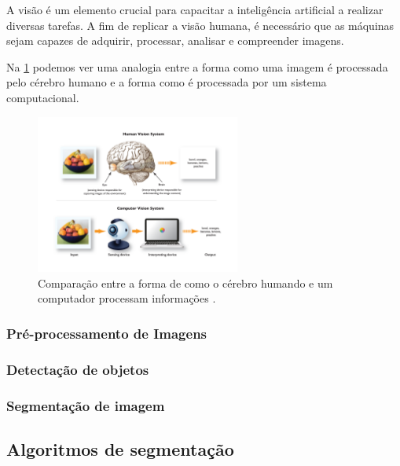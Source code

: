 \documentclass[
	12pt,				%
	openright,			%
	twoside,			%
	a4paper,			%
	english,			%
	french,				%
	spanish,			%
	brazil				%
	]{abntex2}
\begin{document}
A visão é um elemento crucial para capacitar a inteligência artificial a realizar diversas tarefas. A fim de replicar a visão humana, é necessário que as máquinas sejam capazes de adquirir, processar, analisar e compreender imagens. \cite{como_funciona_visao_computacional}

Na \cref{fig:comp_vision} podemos ver uma analogia entre a forma como uma imagem é processada pelo cérebro humano e a forma como é processada por um sistema computacional.

\begin{figure}[!ht]
	\centering
	\includegraphics[width=0.6\textwidth]{figures/content_Human_Vision.png}
	\caption{Comparação entre a forma de como o cérebro humando e um computador processam informações \cite{content_Human_Vision}.}
	\label{fig:comp_vision}
\end{figure}	

\subsubsection{Pré-processamento de Imagens}

\subsubsection{Detectação de objetos}

\subsubsection{Segmentação de imagem}


\subsection{Algoritmos de segmentação}
\subsubsection{}
\end{document}
